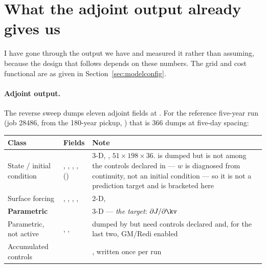 \section{What the adjoint output already gives us}
\label{sec:adjoutput}

I have gone through the output we have and measured it rather than assuming,
because the design that follows depends on these numbers. The grid and cost
functional are as given in Section~\ref{sec:modelconfig}.

\paragraph{Adjoint output.}
The reverse sweep dumps eleven adjoint fields at . For the
reference five-year run (job 28486, from the 180-year pickup, )
that is $366$ dumps at five-day spacing:

\begin{center}
\begin{tabularx}{\textwidth}{@{}Y{0.7}Y{1.1}Y{1.2}@{}}
\toprule
\textbf{Class} & \textbf{Fields} & \textbf{Note}\\
\midrule
State / initial condition & , ,
  , , ()
  & 3-D, , $51\times198\times36$.  is dumped but
     is not among the controls declared in  ---
    $w$ is diagnosed from continuity, not an initial condition --- so it is not
    a prediction target and is bracketed here\\
Surface forcing & , , ,
  , 
  & 2-D, \\
\textbf{Parametric} & 
  & 3-D --- \emph{the target}: $\partial J/\partial\kv$\\
Parametric, not active & , , 
  & dumped by  but need controls declared and,
    for the last two, GM/Redi enabled\\
\midrule
Accumulated controls &  & , written once per run\\
\bottomrule
\end{tabularx}
\end{center}


